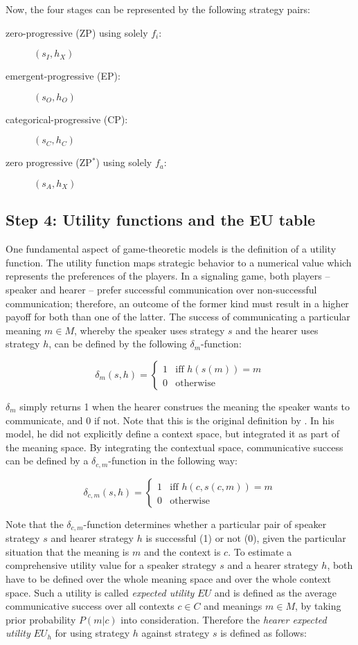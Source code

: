 \documentclass[output=paper,hidelinks]{langscibook}
\begin{document}
\noindent Now, the four stages can be represented by the following strategy pairs:

\begin{description}
\item[zero-progressive (ZP) using solely $f_i$:] $(s_I,h_X)$
\item[emergent-progressive (EP):] $(s_O,h_O)$
\item[categorical-progressive (CP):] $(s_C,h_C)$
\item[zero progressive (ZP$^*$) using solely $f_a$:] $(s_A,h_X)$
\end{description}


\subsection{Step 4: Utility functions and the EU table}
\label{sec4-utility}

One fundamental aspect of game-theoretic models is the definition of a utility function. The utility function maps strategic behavior to a numerical value which represents the preferences of the players. In a signaling game, both players -- speaker and hearer -- prefer successful communication over non-successful communication; therefore, an outcome of the former kind must result in a higher payoff for both than one of the latter. The success of communicating a particular meaning $m \in M$, whereby the speaker uses strategy $s$ and the hearer uses strategy $h$, can be defined by the following $\delta_m$-function:

$$\delta_m(s,h) = \begin{cases}
1 & \text{iff } h(s(m)) = m\\
0 &\text{otherwise} 
\end{cases}$$

$\delta_m$ simply returns 1 when the hearer construes the meaning the speaker wants to communicate, and 0 if not. Note that this is the original definition by \citet{Jaeger07}. In his model, he did not explicitly define a context space, but integrated it as part of the meaning space. By integrating the contextual space, communicative success can be defined by a $\delta_{c,m}$-function in the following way:

$$\delta_{c,m}(s,h) = \begin{cases}
1 & \text{iff } h(c,s(c,m)) = m\\
0 &\text{otherwise} 
\end{cases}$$

Note that the $\delta_{c,m}$-function determines whether a particular pair of speaker strategy $s$ and hearer strategy $h$ is successful (1) or not (0), given the particular situation that the meaning is $m$ and the context is $c$. To estimate a comprehensive utility value for a speaker strategy $s$ and a hearer strategy $h$, both have to be defined over the whole meaning space and over the whole context space. Such a utility is called \emph{expected utility} $EU$ and is defined as the average communicative success over all contexts $c \in C$ and meanings $m \in M$, by taking prior probability $P(m|c)$ into consideration. Therefore the \emph{hearer expected utility} $EU_h$ for using strategy $h$ against strategy $s$ is defined as follows:
\end{document}
